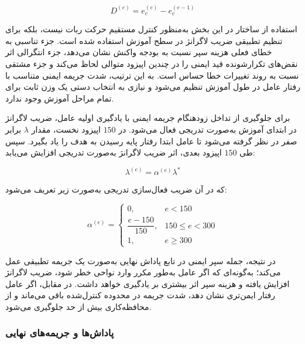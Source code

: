 \begin{equation}
	D^{(e)}
	=
	e_c^{(e)}
	-
	e_c^{(e-1)}
	\label{eq:pid_derivative_final}
\end{equation}

استفاده از ساختار  در این بخش به‌منظور کنترل مستقیم حرکت ربات نیست، بلکه برای تنظیم تطبیقی ضریب لاگرانژ در سطح آموزش استفاده شده است. جزء تناسبی به خطای فعلی هزینه سپر نسبت به بودجه واکنش نشان می‌دهد، جزء انتگرالی اثر نقض‌های تکرارشونده قید ایمنی را در چندین اپیزود متوالی لحاظ می‌کند و جزء مشتقی نسبت به روند تغییرات خطا حساس است. به این ترتیب، شدت جریمه ایمنی متناسب با رفتار عامل در طول آموزش تنظیم می‌شود و نیازی به انتخاب دستی یک وزن ثابت برای تمام مراحل آموزش وجود ندارد.

برای جلوگیری از تداخل زودهنگام جریمه ایمنی با یادگیری اولیه عامل، ضریب لاگرانژ در ابتدای آموزش به‌صورت تدریجی فعال می‌شود. در \(150\) اپیزود نخست، مقدار \(\lambda\) برابر صفر در نظر گرفته می‌شود تا عامل ابتدا رفتار پایه رسیدن به هدف را یاد بگیرد. سپس طی \(150\) اپیزود بعدی، اثر ضریب لاگرانژ به‌صورت تدریجی افزایش می‌یابد:

\begin{equation}
	\lambda^{(e)}
	=
	\alpha^{(e)} \lambda^{*}
	\label{eq:lambda_ramp_final}
\end{equation}

که در آن ضریب فعال‌سازی تدریجی به‌صورت زیر تعریف می‌شود:

\begin{equation}
	\alpha^{(e)}
	=
	\begin{cases}
		0,
		& e < 150\\
		\dfrac{e-150}{150},
		& 150 \le e < 300\\
		1,
		& e \ge 300
	\end{cases}
	\label{eq:lambda_warmup_ramp_final}
\end{equation}

در نتیجه، جمله سپر ایمنی در تابع پاداش نهایی به‌صورت یک جریمه تطبیقی عمل می‌کند؛ به‌گونه‌ای که اگر عامل به‌طور مکرر وارد نواحی خطر شود، ضریب لاگرانژ افزایش یافته و هزینه سپر اثر بیشتری بر یادگیری خواهد داشت. در مقابل، اگر عامل رفتار ایمن‌تری نشان دهد، شدت جریمه در محدوده کنترل‌شده باقی می‌ماند و از محافظه‌کاری بیش از حد جلوگیری می‌شود.

\subsubsection{پاداش‌ها و جریمه‌های نهایی}
\label{subsubsec:terminal_reward_final}

